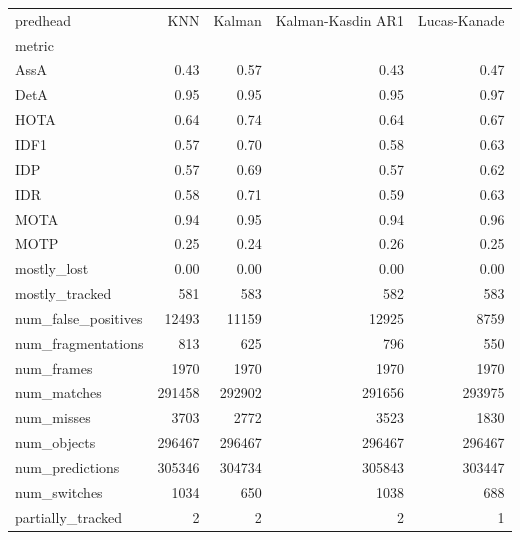 \begin{tabular}{lrrrr}
\toprule
predhead & KNN & Kalman & Kalman-Kasdin AR1 & Lucas-Kanade \\
metric &  &  &  &  \\
\midrule
AssA & 0.43 & 0.57 & 0.43 & 0.47 \\
DetA & 0.95 & 0.95 & 0.95 & 0.97 \\
HOTA & 0.64 & 0.74 & 0.64 & 0.67 \\
IDF1 & 0.57 & 0.70 & 0.58 & 0.63 \\
IDP & 0.57 & 0.69 & 0.57 & 0.62 \\
IDR & 0.58 & 0.71 & 0.59 & 0.63 \\
MOTA & 0.94 & 0.95 & 0.94 & 0.96 \\
MOTP & 0.25 & 0.24 & 0.26 & 0.25 \\
mostly_lost & 0.00 & 0.00 & 0.00 & 0.00 \\
mostly_tracked & 581 & 583 & 582 & 583 \\
num_false_positives & 12493 & 11159 & 12925 & 8759 \\
num_fragmentations & 813 & 625 & 796 & 550 \\
num_frames & 1970 & 1970 & 1970 & 1970 \\
num_matches & 291458 & 292902 & 291656 & 293975 \\
num_misses & 3703 & 2772 & 3523 & 1830 \\
num_objects & 296467 & 296467 & 296467 & 296467 \\
num_predictions & 305346 & 304734 & 305843 & 303447 \\
num_switches & 1034 & 650 & 1038 & 688 \\
partially_tracked & 2 & 2 & 2 & 1 \\
\bottomrule
\end{tabular}
